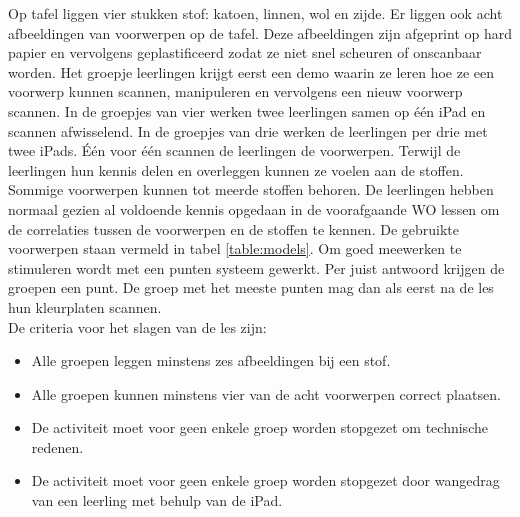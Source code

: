\documentclass[pdftex,a4paper,12pt,twoside]{report}
\begin{document}
Op tafel liggen vier stukken stof: katoen, linnen, wol en zijde. Er liggen ook acht afbeeldingen van voorwerpen op de tafel. Deze afbeeldingen zijn afgeprint op hard papier en vervolgens geplastificeerd zodat ze niet snel scheuren of onscanbaar worden. Het groepje leerlingen krijgt eerst een demo waarin ze leren hoe ze een voorwerp kunnen scannen, manipuleren en vervolgens een nieuw voorwerp scannen. In de groepjes van vier werken twee leerlingen samen op \'e\'en iPad en scannen afwisselend. In de groepjes van drie werken de leerlingen per drie met twee iPads. \'E\'en voor \'e\'en scannen de leerlingen de voorwerpen. Terwijl de leerlingen hun kennis delen en overleggen kunnen ze voelen aan de stoffen. Sommige voorwerpen kunnen tot meerde stoffen behoren. De leerlingen hebben normaal gezien al voldoende kennis opgedaan in de voorafgaande WO lessen om de correlaties tussen de voorwerpen en de stoffen te kennen. De gebruikte voorwerpen staan vermeld in tabel \ref{table:models}. Om goed meewerken te stimuleren wordt met een punten systeem gewerkt. Per juist antwoord krijgen de groepen een punt. De groep met het meeste punten mag dan als eerst na de les hun kleurplaten scannen. \\

De criteria voor het slagen van de les zijn:
\begin{itemize}
\item Alle groepen leggen minstens zes afbeeldingen bij een stof.
\item Alle groepen kunnen minstens vier van de acht voorwerpen correct plaatsen.
\item De activiteit moet voor geen enkele groep worden stopgezet om technische redenen.
\item De activiteit moet voor geen enkele groep worden stopgezet door wangedrag van een leerling met behulp van de iPad.
\end{itemize}
\end{document}
